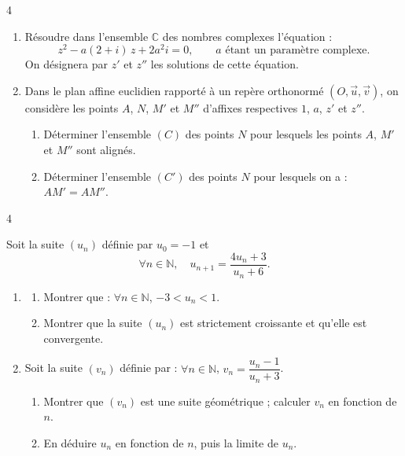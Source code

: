 \documentclass{axiobac}
\begin{document}
\entete

\begin{exercice}{4}

\begin{enumerate}
    \item Résoudre dans l'ensemble $\mathbb{C}$ des nombres complexes l'équation :
    \[
    z^2 - a(2 + i)\,z + 2a^2 i = 0, \qquad a \text{ étant un paramètre complexe.}
    \]
    On désignera par $z'$ et $z''$ les solutions de cette équation.
    \item Dans le plan affine euclidien rapporté à un repère orthonormé $(O, \vec{u}, \vec{v})$, on considère les points $A$, $N$, $M'$ et $M''$ d'affixes respectives $1$, $a$, $z'$ et $z''$.
    \begin{enumerate}
        \item Déterminer l'ensemble $(C)$ des points $N$ pour lesquels les points $A$, $M'$ et $M''$ sont alignés.
        \item Déterminer l'ensemble $(C')$ des points $N$ pour lesquels on a : $AM' = AM''$.
    \end{enumerate}
\end{enumerate}

\end{exercice}

\begin{exercice}{4}

Soit la suite $(u_n)$ définie par $u_0 = -1$ et
\[
\forall n \in \mathbb{N}, \quad u_{n+1} = \frac{4u_n + 3}{u_n + 6} .
\]

\begin{enumerate}
    \item
    \begin{enumerate}
        \item Montrer que : $\forall n \in \mathbb{N}$, $-3 < u_n < 1$.
        \item Montrer que la suite $(u_n)$ est strictement croissante et qu'elle est convergente.
    \end{enumerate}
    \item Soit la suite $(v_n)$ définie par : $\forall n \in \mathbb{N}$, $v_n = \dfrac{u_n - 1}{u_n + 3}$.
    \begin{enumerate}
        \item Montrer que $(v_n)$ est une suite géométrique ; calculer $v_n$ en fonction de $n$.
        \item En déduire $u_n$ en fonction de $n$, puis la limite de $u_n$.
    \end{enumerate}
\end{enumerate}

\end{exercice}
\end{document}
